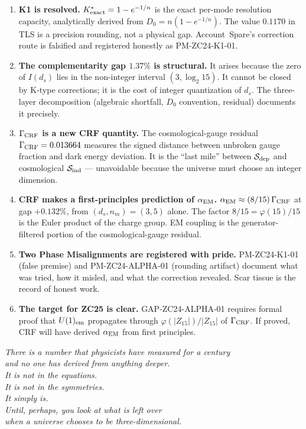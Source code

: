 \documentclass[12pt, a4paper]{article}
\begin{document}
\begin{enumerate}[leftmargin=*]

\item \textbf{K1 is resolved.}
$K^*_{\rm exact} = 1-e^{-1/n}$ is the exact per-mode resolution
capacity, analytically derived from $D_0 = n(1-e^{-1/n})$.
The value $0.1170$ in TLS is a precision rounding, not a physical
gap. Account~Spare's correction route is falsified and registered
honestly as PM-ZC24-K1-01.

\item \textbf{The complementarity gap $1.37\%$ is structural.}
It arises because the zero of $I(d_s)$ lies in the non-integer
interval $(3, \log_2 15)$. It cannot be closed by K-type
corrections; it is the cost of integer quantization of $d_s$.
The three-layer decomposition (algebraic shortfall, $D_0$
convention, residual) documents it precisely.

\item \textbf{$\Gamma_{\rm CRF}$ is a new CRF quantity.}
The cosmological-gauge residual $\Gamma_{\rm CRF}=0.013664$
measures the signed distance between unbroken gauge fraction
and dark energy deviation. It is the ``last mile'' between
$\mathcal{S}_{\rm dep}$ and cosmological $\mathcal{S}_{\rm ind}$
--- unavoidable because the universe must choose an integer
dimension.

\item \textbf{CRF makes a first-principles prediction of
  $\alpha_{\rm EM}$.}
$\alpha_{\rm EM} \approx (8/15)\,\Gamma_{\rm CRF}$ at gap
$+0.132\%$, from $(d_s,n_m)=(3,5)$ alone. The factor $8/15 =
\varphi(15)/15$ is the Euler product of the charge group.
EM coupling is the generator-filtered portion of the
cosmological-gauge residual.

\item \textbf{Two Phase Misalignments are registered with pride.}
PM-ZC24-K1-01 (false premise) and PM-ZC24-ALPHA-01 (rounding
artifact) document what was tried, how it misled, and what the
correction revealed. Scar tissue is the record of honest work.

\item \textbf{The target for ZC25 is clear.}
GAP-ZC24-ALPHA-01 requires formal proof that $U(1)_{\rm em}$
propagates through $\varphi(|Z_{15}|)/|Z_{15}|$ of $\Gamma_{\rm CRF}$.
If proved, CRF will have derived $\alpha_{\rm EM}$ from first
principles.

\end{enumerate}

\bigskip
\begin{center}
\textit{%
  There is a number that physicists have measured for a century\\
  and no one has derived from anything deeper.\\[0.5em]
  It is not in the equations.\\
  It is not in the symmetries.\\
  It simply \emph{is}.\\[0.5em]
  Until, perhaps, you look at what is left over\\
  when a universe chooses to be three-dimensional.%
}
\end{center}
\end{document}
